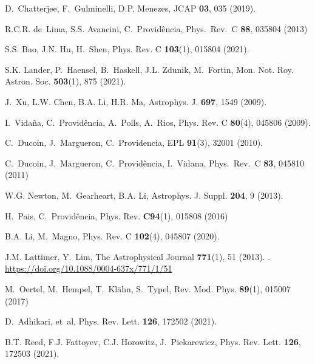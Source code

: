 \documentclass[epj]{svjour}
\begin{document}
\begin{thebibliography}{10}
D.~Chatterjee, F.~Gulminelli, D.P. Menezes, JCAP \textbf{03}, 035 (2019).
\newblock {}

R.C.R. de~Lima, S.S. Avancini, C.~Provid\^encia, Phys.\ Rev.\ C \textbf{88},
  035804 (2013)

S.S. Bao, J.N. Hu, H.~Shen, Phys. Rev. C \textbf{103}(1), 015804 (2021).
\newblock {}

S.K. Lander, P.~Haensel, B.~Haskell, J.L. Zdunik, M.~Fortin, Mon. Not. Roy.
  Astron. Soc. \textbf{503}(1), 875 (2021).
\newblock {}

J.~Xu, L.W. Chen, B.A. Li, H.R. Ma, Astrophys. J. \textbf{697}, 1549 (2009).
\newblock {}

I.~{Vida{\~n}a}, C.~{Provid{\^e}ncia}, A.~{Polls}, A.~{Rios}, Phys. Rev. C
  \textbf{80}(4), 045806 (2009).
\newblock {}

C.~Ducoin, J.~Margueron, C.~Providencia, EPL \textbf{91}(3), 32001 (2010).
\newblock {}

C.~Ducoin, J.~Margueron, C.~Provid\^encia, I.~Vidana, Phys.\ Rev.\ C
  \textbf{83}, 045810 (2011)

W.G. Newton, M.~Gearheart, B.A. Li, Astrophys. J. Suppl. \textbf{204}, 9
  (2013).
\newblock {}

H.~Pais, C.~Providência, Phys. Rev. \textbf{C94}(1), 015808 (2016)

B.A. Li, M.~Magno, Phys. Rev. C \textbf{102}(4), 045807 (2020).
\newblock {}

J.M. Lattimer, Y.~Lim, The Astrophysical Journal \textbf{771}(1), 51 (2013).
\newblock {}.
\newblock \urlprefix\url{https://doi.org/10.1088/0004-637x/771/1/51}

M.~Oertel, M.~Hempel, T.~Klähn, S.~Typel, Rev. Mod. Phys. \textbf{89}(1),
  015007 (2017)

D.~Adhikari, et~al, Phys. Rev. Lett. \textbf{126}, 172502 (2021).
\newblock {}

B.T. Reed, F.J. Fattoyev, C.J. Horowitz, J.~Piekarewicz, Phys. Rev. Lett.
  \textbf{126}, 172503 (2021).
\newblock {}


\end{thebibliography}
\end{document}
